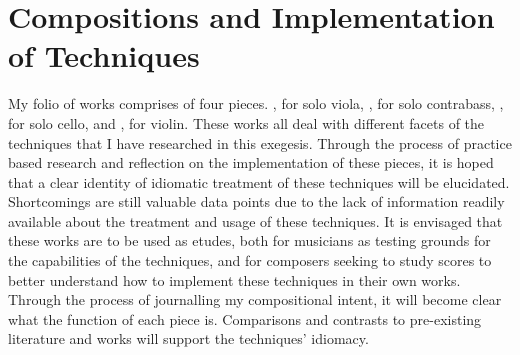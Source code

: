 

\chapter{Compositions and Implementation of Techniques}




My folio of works comprises of four pieces. , for solo viola, , for solo contrabass, , for solo cello, and , for violin. 
These works all deal with different facets of the techniques that I have researched in this exegesis. 
Through the process of practice based research and reflection on the implementation of these pieces, it is hoped that a clear identity of idiomatic treatment of these techniques will be elucidated.
Shortcomings are still valuable data points due to the lack of information readily available about the treatment and usage of these techniques.
It is envisaged that these works are to be used as etudes, both for musicians as testing grounds for the capabilities of the techniques, and for composers seeking to study scores to better understand how to implement these techniques in their own works.
Through the process of journalling my compositional intent, it will become clear what the function of each piece is.
Comparisons and contrasts to pre-existing literature and works will support the techniques' idiomacy. 



